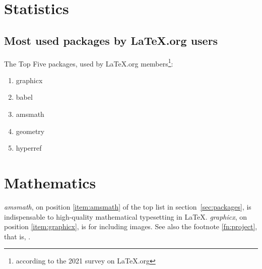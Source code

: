 \documentclass{book}
\begin{document}
\chapter{Statistics}
\section{Most used packages by LaTeX.org users}
\label{sec:packages}
The Top Five packages, used by LaTeX.org
members\footnote{according to the 2021 survey on
LaTeX.org\label{fn:project}}:
\begin{enumerate}
  \item graphicx\label{item:graphicx}
  \item babel
  \item amsmath\label{item:amsmath}
  \item geometry
  \item hyperref
\end{enumerate}
\chapter{Mathematics}
\emph{amsmath}, on position \vref{item:amsmath} of the top list
in section~\vref{sec:packages}, is indispensable to high-quality
mathematical typesetting in \LaTeX. \emph{graphicx}, on position
\vref{item:graphicx}, is for including images. See also the
footnote \vref{fn:project}, that is, .
\end{document}
